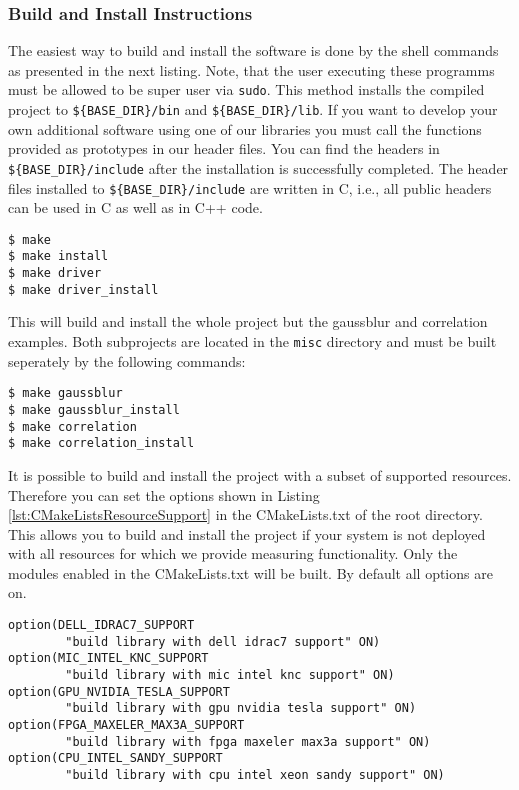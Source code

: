 \subsubsection{Build and Install Instructions}\label{sec:BuildInstallInstructions}
The easiest way to build and install the software is done by the shell commands as presented in the next listing. Note, that the user executing these programms must be allowed to be super user via \texttt{sudo}. This method installs the compiled project to \texttt{\$\{BASE\_DIR\}/bin} and \texttt{\$\{BASE\_DIR\}/lib}. If you want to develop your own additional software using one of our libraries you must call the functions provided as prototypes in our header files. You can find the headers in \texttt{\$\{BASE\_DIR\}/include} after the installation is successfully completed. The header files installed to \texttt{\$\{BASE\_DIR\}/include} are written in C, i.e., all public headers can be used in C as well as in C++ code.

\begin{lstlisting}[caption={Default build instructions.}, label=lst:Make]
$ make
$ make install
$ make driver
$ make driver_install
\end{lstlisting}

This will build and install the whole project but the gaussblur and correlation examples. Both subprojects are located in the \texttt{misc} directory and must be built seperately by the following commands:

\pagebreak

\begin{lstlisting}[caption={Default build instructions for additional applications. Note, that you need the PGI OpenACC compiler as well as Nvidia's \texttt{nvcc}.}, label=lst:MakeApps]
$ make gaussblur
$ make gaussblur_install
$ make correlation
$ make correlation_install
\end{lstlisting}

It is possible to build and install the project with a subset of supported resources. Therefore you can set the options shown in Listing \ref{lst:CMakeListsResourceSupport} in the CMakeLists.txt of the root directory. This allows you to build and install the project if your system is not deployed with all resources for which we provide measuring functionality. Only the modules enabled in the CMakeLists.txt will be built. By default all options are on.
\begin{lstlisting}[caption={CMakeLists.txt options.}, label=lst:CMakeListsResourceSupport]
option(DELL_IDRAC7_SUPPORT
		"build library with dell idrac7 support" ON)
option(MIC_INTEL_KNC_SUPPORT 
		"build library with mic intel knc support" ON)
option(GPU_NVIDIA_TESLA_SUPPORT 
		"build library with gpu nvidia tesla support" ON)
option(FPGA_MAXELER_MAX3A_SUPPORT 
		"build library with fpga maxeler max3a support" ON)
option(CPU_INTEL_SANDY_SUPPORT 
		"build library with cpu intel xeon sandy support" ON)
\end{lstlisting}

